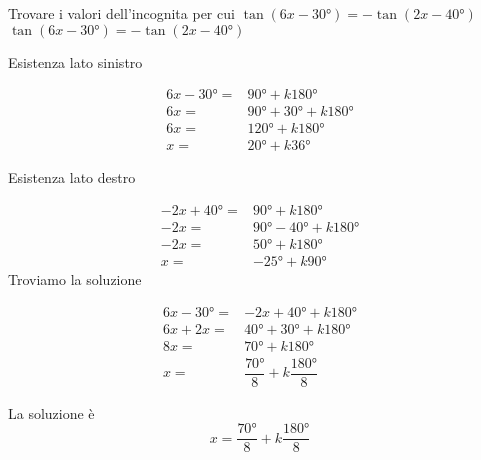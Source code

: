 \begin{exercise}
	Trovare i valori dell'incognita per cui $\tan(6x-\ang{30;;})=-\tan(2x-\ang{40;;})$
	\tcblower
	 $\tan(6x-\ang{30;;})=-\tan(2x-\ang{40;;})$
	
	Esistenza lato sinistro
	
	\begin{align*}
		6x-\ang{30;;}=&\ang{90;;}+k\ang{180;;}\\
		6x=&\ang{90;;}+\ang{30;;}+k\ang{180;;}\\
		6x=&\ang{120;;}+k\ang{180;;}\\
		x=&\ang{20;;}+k\ang{36;;}
		\end{align*}
	
	Esistenza lato destro
	
	\begin{align*}
		-2x+\ang{40;;}=&\ang{90;;}+k\ang{180;;}\\
		-2x=&\ang{90;;}-\ang{40;;}+k\ang{180;;}\\
		-2x=&\ang{50;;}+k\ang{180;;}\\
		x=&-\ang{25;;}+k\ang{90;;}
		\end{align*}
	Troviamo la soluzione
	
		\begin{align*}
		6x-\ang{30;;}=&-2x+\ang{40;;}+k\ang{180;;}\\
		6x+2x=&\ang{40;;}+\ang{30;;}+k\ang{180;;}\\
		8x=&\ang{70;;}+k\ang{180;;}\\
		x=&\dfrac{\ang{70;;}}{8}+k\dfrac{\ang{180;;}}{8}
		\end{align*}
	
	La soluzione è
	\[x=\dfrac{\ang{70;;}}{8}+k\dfrac{\ang{180;;}}{8}\]
\end{exercise}
